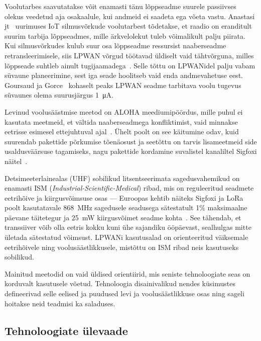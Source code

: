 \documentclass[12pt]{article}
\begin{document}
    Voolutarbes saavutatakse võit enamasti tänu lõppseadme suurele passiivses olekus veedetud aja osakaalule, kui andmeid ei saadeta ega võeta vastu.
    Anastasi jt~\cite{anastasi} uurimuses IoT silmusvõrkude voolutarbest tõdetakse, et raadio on eranditult suurim tarbija lõppseadmes, mille ärkvelolekut tuleb võimalikult palju piirata.
    Kui silmusvõrkudes kulub suur osa lõppseadme ressursist naaberseadme retransleerimisele, siis LPWAN võrgud töötavad üldiselt vaid tähtvõrguna, milles lõppseade suhtleb ainult tugijaamadega~\cite{centenaro}.
    Selle tõttu on LPWANidel palju vabam süvaune planeerimine, sest iga seade hoolitseb vaid enda andmevahetuse eest.
    Goursaud ja Gorce~\cite{goursaud} kohaselt peaks LPWAN seadme tarbitava voolu tugevus süvaunes olema suurusjärgus \SI{1}{\micro\ampere}.

    Levinud voolusäästmise meetod on ALOHA meediumipöördus, mille puhul ei kasutata meetmeid, et vältida naaberseadmega konfliktimist, vaid minnakse eetrisse esimesel ettejuhtuval ajal~\cite{raza}.
    Ühelt poolt on see käitumine odav, kuid suurendab pakettide põrkumise tõenäosust ja seetõttu on tarvis lisameetmeid side usaldusväärsuse tagamiseks, nagu pakettide kordamine suvalistel kanaliltel Sigfoxi näitel~\cite{raza}.

    Detsimeeterlainealas (UHF) sobilikud litsentseerimata sagedusvahemikud on enamasti ISM (\textit{Industrial-Scientific-Medical}) ribad, mis on reguleeritud seadmete eetrihõive ja kiirgusvõimsuse osas — Euroopas kehtib näiteks Sigfoxi ja LoRa poolt kasutatavale \SI{868}{\mega\hertz} sagedusele seadusega sätestatult 1\% maksimaalne päevane täitetegur ja \SI{25}{\milli\watt} kiirgusvõimet seadme kohta~\cite{etsi}.
    See tähendab, et transsiiver võib olla eetris kokku kuni ühe sajandiku ööpäevast, sealhulgas mitte ületada sätestatud võimsust.
    LPWANi kasutusalad on orienteeritud väiksemale eetrihõivele ning voolusäästlikkusele, mistõttu on ISM ribad neis kasutuseks sobilikud.

    Mainitud meetodid on vaid üldised orientiirid, mis seniste tehnoloogiate seas on korduvalt kasutusele võetud.
    Tehnoloogia disainivalikud nendes küsimustes defineerivad selle eelised ja puudused levi ja voolusäästlikkuse osas ning sageli hoitakse neid teadmisi ka saladuses.

    \subsection{Tehnoloogiate ülevaade}
\end{document}
